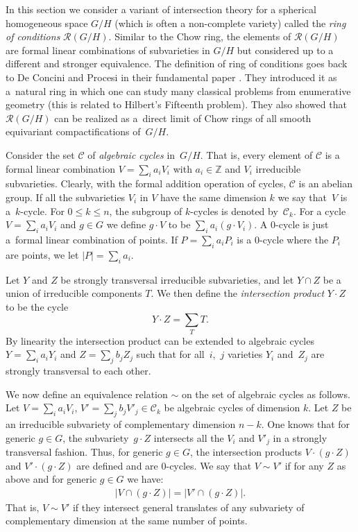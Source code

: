 \documentclass[10pt,a4paper]{amsart}
\def \Z{\mathbb{Z}}
\numberwithin{equation}{section}
\theoremstyle{definition}
\begin{document}
In this section we consider a variant of intersection theory for a spherical homogeneous space $G/H$ (which is often a non-complete variety) called the {\it ring of conditions} $\mathcal{R}(G/H)$. Similar to the Chow ring, the elements of $\mathcal{R}(G/H)$ are formal linear combinations of subvarieties in $G/H$ but considered up to a different and stronger equivalence. The definition of ring of conditions goes back to De Concini and Procesi in their fundamental paper \cite{DP}. They introduced it as a~natural ring in which one can study many classical problems from enumerative geometry (this is related to Hilbert's Fifteenth problem). They also showed that~$\mathcal{R}(G/H)$ can be realized as a~direct limit of Chow rings of all smooth equivariant compactifications of~$G/H$.

Consider the set $\mathcal{C}$ of {\it algebraic cycles} in~$G/H$. That is, every element of $\mathcal{C}$ is a formal linear combination $V = \sum_i a_i V_i$ with $a_i \in \Z$ and $V_i$ irreducible subvarieties. Clearly, with the formal addition operation of cycles, $\mathcal{C}$ is an abelian group. If all the subvarieties $V_i$ in $V$ have the same dimension $k$ we say that~$V$ is a~$k$-cycle. For $0 \leq k \leq n$, the subgroup of $k$-cycles is denoted by~$\mathcal{C}_k$. For a cycle $V = \sum_i a_i V_i$ and $g \in G$ we define $g \cdot V$ to be $\sum_i a_i(g \cdot V_i)$. A $0$-cycle is just a~formal linear combination of points. If $P = \sum_i a_i P_i$ is a $0$-cycle where the $P_i$ are points, we let $|P| = \sum_i a_i$.

Let $Y$ and $Z$ be strongly transversal irreducible subvarieties, and let $Y \cap Z$ be a union of irreducible components $T$. We then define the {\it intersection product} $Y \cdot Z$ to be the cycle
\[
Y \cdot Z= \sum_T T.
\]
By linearity the intersection product can be extended to algebraic cycles $Y = \sum_i a_i Y_i$ and $Z = \sum_j b_j Z_j$ such that for all~$i$,~$j$ varieties $Y_i$ and~$Z_j$ are strongly transversal to each other.

We now define an equivalence relation $\sim$ on the set of algebraic cycles as follows. Let $V=\sum_i a_i V_i$, $V'=\sum_j b_j V'_j \in \mathcal{C}_k$ be algebraic cycles of dimension $k$. Let $Z$ be an irreducible sub\-va\-riety of complementary dimension $n - k$. One knows that for generic $g \in G$, the subvariety~$g \cdot Z$ intersects all the $V_i$ and $V'_j$ in a strongly transversal fashion. Thus, for generic $g \in G$, the intersection products $V \cdot (g \cdot Z)$ and $V' \cdot (g \cdot Z)$ are defined and are $0$-cycles. We say that $V \sim V'$ if
for any $Z$ as above and for generic $g \in G$ we have:
\begin{gather} %
 |V \cap (g \cdot Z)| = |V' \cap (g \cdot Z)|.
 \end{gather}
That is, $V \sim V'$ if they intersect general translates of any subvariety of complementary dimension at the same number of points.
\end{document}
